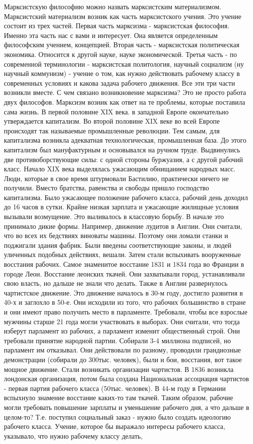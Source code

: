 Марксистскую философию можно назвать марксистским материализмом. Марксистский материализм возник как часть марксистского учения. Это учение состоит из трех частей. Первая часть марксизма - марксистская философия. Именно эта часть нас с вами и интересует. Она является определенным философским учением, концепцией. Вторая часть - марксистская политическая экономика. Относится к другой науке, науке экономической. Третья часть - по современной терминологии - марксистская политология, научный социализм (ну научный коммунизм) - учение о том, как нужно действовать рабочему классу в современных условиях и какова задача рабочего движения. Все эти три части возникли вместе. С чем связано возникновение марксизма? Это не просто работа двух философов. Марксизм возник как ответ на те проблемы, которые поставила сама жизнь. В первой половине XIX века. в западной Европе окончательно утверждается капитализм. Во второй половине XIX веке во всей Европе происходят так называемые промышленные революции. Тем самым, для капитализма возникла адекватная технологическая, промышленная база. До этого капитализм был мануфактурным и основывался на ручном труде. Выдвинулись две противоборствующие силы: с одной стороны буржуазия, а с другой рабочий класс. Начало XIX века выделялась ужасающим обнищанием народных масс. Люди, которые в свое время штурмовали Бастилию, практически ничего не получили. Вместо братства, равенства и свободы пришло господство капитализма. Было ужасающее положение рабочего класса, рабочий день доходил до 16 часов в сутки. Крайне низкая зарплата и ужасающие жилищные условия вызывали возмущение. Это выливалось в классовую борьбу. В начале это принимало дикие формы. Например, движение лудитов в Англии. Они считали, что во всех их бедствиях виноваты машины. Поэтому они ломали станки и поджигали здания фабрик. Были введены соответствующие законы, и людей уличенных подобных действиях, вешали. Затем стали вспыхивать вооруженные восстания рабочих. Самое знаменитое восстание 1831 и 1834 года во Франции в городе Леон. Восстание леонских ткачей. Они захватывали город, устанавливали свою власть, но дальше не знали что делать. Также в Англии развернулось чартистское движение. Это движение началось в 30-м году, достигло развития в 40-х и заглохло в 50-е. Они исходили из того, что рабочих большинство в стране и они имеют право получить место в парламенте. Требовали, чтобы все взрослые мужчины старше 21 года могли участвовать в выборах. Они считали, что тогда изберут парламент из рабочих, а парламент изменит общественный строй. Они требовали принятие народной партии. Собирали 3-4 миллиона подписей, но парламент им отказывал. Они действовали по разному, проводили грандиозные демонстрации (собирали до 300тыс. человек), были и бои, восстания, вот такое мощное движение. Стали возникать организации чартистов. В 1836 возникла лондонская организация, потом была создана Национальная ассоциация чартистов - первая партия рабочего класса (50тыс. человек). В 44-м году в Германии вспыхнуло знамение восстание каких-то там ткачей. Таким образом, рабочие могли требовать повышение зарплаты и уменьшение рабочего дня, а что дальше в целом-то? Т.е. поступил социальный заказ - нужно было создать идеологию рабочего класса. Учение, которое бы выражало интересы рабочего класса, указывало, что нужно рабочему классу делать, 